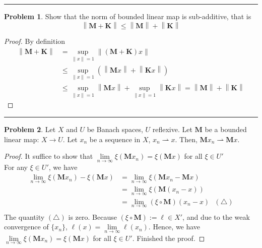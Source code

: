\documentclass[a4paper, 10pt]{article}
\theoremstyle{definition}
\newtheorem{problem}{Problem}
\theoremstyle{hSol}
\begin{document}
\noindent\rule{16cm}{0.4pt}
\begin{problem} Show that the norm of bounded linear map is sub-additive, that is
$$
\left\|\bm{M} + \bm{K}\right\| \leq \left\|\bm{M}\right\| + \left\|\bm{K}\right\|
$$
\end{problem}
\begin{proof} By definition
\begin{equation}
	\begin{split}
		\left\|\bm{M}+ \bm{K}\right\| &= \sup\limits_{\left\|x\right\|=1} \left\|(\bm{M}+\bm{K})x\right\| \\
		&\leq  \sup\limits_{\left\|x\right\|=1} \left(\left\|\bm{M}x\right\| + \left\|\bm{K}x\right\|\right) \\
		&\leq \sup\limits_{\left\|x\right\|=1} \left\|\bm{M}x\right\| + \sup\limits_{\left\|x\right\|=1} \left\|\bm{K}x\right\| = \left\|\bm{M}\right\| + \left\|\bm{K}\right\|
	\end{split}
\end{equation}
\end{proof}

\noindent\rule{16cm}{0.4pt}
\begin{problem} Let $X$ and $U$ be Banach spaces, $U$ reflexive. Let $\bm{M}$ be a bounded linear map: $X \to U$. Let $x_n$ be a sequence in $X$, $x_n \rightharpoonup x$. Then, $\bm{M}x_n \rightharpoonup \bm{M}x$.
\end{problem}
\begin{proof} It suffice to show that $\lim\limits_{n\rightarrow\infty}\xi(\bm{M}x_n) = \xi(\bm{M}x)$ for all $\xi \in U'$ \\
For any $\xi \in U'$, we have
\begin{equation}
	\begin{split}
		\lim\limits_{n\rightarrow\infty} \xi(\bm{M}x_n) - \xi(\bm{M}x)
		&= \lim\limits_{n\rightarrow\infty}\xi(\bm{M}x_n - \bm{M}x) \\
		&= \lim\limits_{n\rightarrow\infty}\xi(\bm{M}(x_n - x)) \\
		&= \lim\limits_{n\rightarrow\infty}(\xi \circ \bm{M})(x_n - x)~~~(\triangle)\\
	\end{split}
\end{equation}
The quantity $(\triangle)$ is zero. Because $(\xi \circ \bm{M}):=\ell \in X'$, and due to the weak convergence of $\{x_n\}$, $\ell(x)=\lim\limits_{n\rightarrow\infty}\ell(x_n)$. Hence, we have $\lim\limits_{n\rightarrow\infty} \xi(\bm{M}x_n) = \xi(\bm{M}x)$ for all $\xi \in U'$. Finished the proof.
\end{proof}
\end{document}
